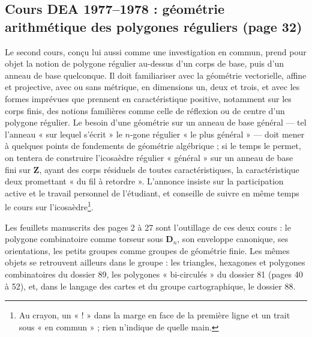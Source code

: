 \documentclass[11pt,a4paper]{article}
\begin{document}
\subsection*{Cours DEA 1977--1978 : géométrie arithmétique des polygones réguliers (page 32)}

Le second cours, conçu lui aussi comme une investigation en commun, prend
pour objet la notion de polygone régulier au-dessus d'un corps de base, puis
d'un anneau de base quelconque. Il doit familiariser avec la géométrie
vectorielle, affine et projective, avec ou sans métrique, en dimensions un,
deux et trois, et avec les formes imprévues que prennent en caractéristique
positive, notamment sur les corps finis, des notions familières comme celle de
réflexion ou de centre d'un polygone régulier. Le besoin d'une géométrie sur
un anneau de base général --- tel l'anneau « sur lequel s'écrit » le $n$-gone
régulier « le plus général » --- doit mener à quelques points de fondements de
géométrie algébrique ; si le temps le permet, on tentera de construire
l'icosaèdre régulier « général » sur un anneau de base fini sur $\mathbf{Z}$,
ayant des corps résiduels de toutes caractéristiques, la caractéristique deux
promettant « du fil à retordre ». L'annonce insiste sur la participation
active et le travail personnel de l'étudiant, et conseille de suivre en même
temps le cours sur l'icosaèdre\footnote{Au crayon, un « ! » dans la marge en
face de la première ligne et un trait sous « en commun » ; rien n'indique de
quelle main.}.

Les feuillets manuscrits des pages 2 à 27 sont l'outillage de ces deux cours :
le polygone combinatoire comme torseur sous $\mathbf{D}_n$, son enveloppe
canonique, ses orientations, les petits groupes comme groupes de géométrie
finie. Les mêmes objets se retrouvent ailleurs dans le groupe : les triangles,
hexagones et polygones combinatoires du dossier 89, les polygones
« bi-circulés » du dossier 81 (pages 40 à 52), et, dans le langage des
cartes et du groupe cartographique, le dossier 88.
\end{document}
